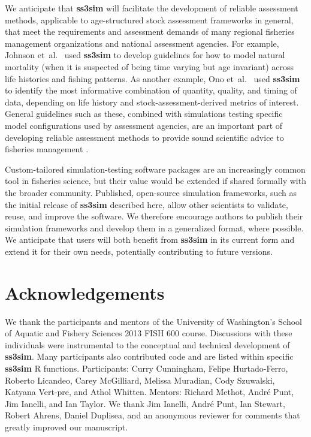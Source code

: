 \documentclass[10pt]{article}
\begin{document}
We anticipate that \textbf{ss3sim} will facilitate the development of reliable
assessment methods, applicable to age-structured stock assessment frameworks in
general, that meet the requirements and assessment demands of many regional
fisheries management organizations and national assessment agencies. For
example, Johnson et~al.~\cite{johnson2014} used \textbf{ss3sim} to
develop guidelines for how to model natural mortality (when it is suspected of
being time varying but age invariant) across life histories and fishing
patterns. As another example, Ono et~al.~\cite{ono2014} used
\textbf{ss3sim} to identify the most informative combination of quantity,
quality, and timing of data, depending on life history and
stock-assessment-derived metrics of interest. General guidelines such as these,
combined with simulations testing specific model configurations used by
assessment agencies, are an important part of developing reliable assessment
methods to provide sound scientific advice to fisheries management
\cite{deroba2014, crone2013}.

Custom-tailored simulation-testing software packages are an increasingly common
tool in fisheries science, but their value would be extended if shared formally
with the broader community. Published, open-source simulation frameworks, such
as the initial release of \textbf{ss3sim} described here, allow other
scientists to validate, reuse, and improve the software. We therefore encourage
authors to publish their simulation frameworks and develop them in a
generalized format, where possible. We anticipate that users will both benefit
from \textbf{ss3sim} in its current form and extend it for their own needs,
potentially contributing to future versions.

\section*{Acknowledgements}

We thank the participants and mentors of the University of Washington's School
of Aquatic and Fishery Sciences 2013 FISH 600 course. Discussions with these
individuals were instrumental to the conceptual and technical development of
\textbf{ss3sim}. Many participants also contributed code and are listed within
specific \textbf{ss3sim} \textsf{R} functions. Participants: Curry Cunningham,
Felipe Hurtado-Ferro, Roberto Licandeo, Carey McGilliard, Melissa Muradian,
Cody Szuwalski, Katyana Vert-pre, and Athol Whitten. Mentors: Richard Methot,
Andr\'{e} Punt, Jim Ianelli, and Ian Taylor. We thank Jim Ianelli, Andr\'{e}
Punt, Ian Stewart, Robert Ahrens, Daniel Duplisea, and an anonymous reviewer
for comments that greatly improved our manuscript.
\end{document}
